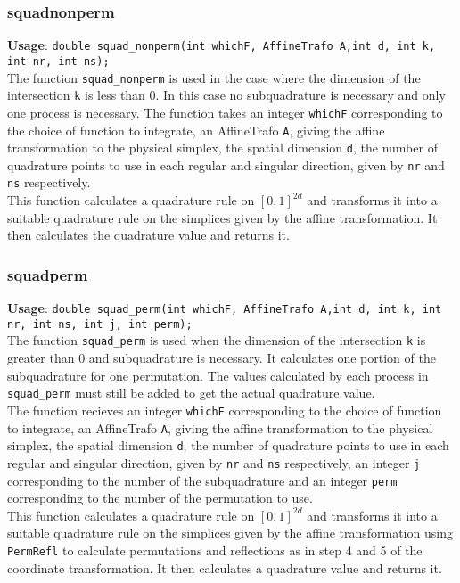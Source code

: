 \documentclass[a4paper,10pt]{article}
\begin{document}
\subsubsection{squad\textunderscore nonperm}
\textbf{Usage}: \verb=double squad_nonperm(int whichF, AffineTrafo A,int d, int k, int nr, int ns);=\\
The function \verb=squad_nonperm= is used in the case where the dimension of the intersection \verb=k= is less
than 0. In this case no subquadrature is necessary and only one process is necessary.
The function takes an integer \verb=whichF= corresponding to the choice of function to integrate, an AffineTrafo
\verb=A=, giving the affine transformation to the physical simplex, the spatial dimension \verb=d=, the number of
quadrature points to use in each regular and singular direction, given by \verb=nr= and \verb=ns= respectively.\\
This function calculates a quadrature rule on $[0,1]^{2d}$ and transforms it into a suitable quadrature rule on
the simplices given by the affine transformation. It then calculates the quadrature value and returns it.
\subsubsection{squad\textunderscore perm}
\textbf{Usage}: \verb=double squad_perm(int whichF, AffineTrafo A,int d, int k, int nr, int ns, int j, int perm);=\\
The function \verb=squad_perm= is used when the dimension of the intersection \verb=k= is greater than 0 and
subquadrature is necessary. It calculates one portion of the subquadrature for one permutation. The values 
calculated by each process in \verb=squad_perm= must still be added to get the actual quadrature value.\\
The function recieves an integer \verb=whichF= corresponding to the choice of function to integrate, an AffineTrafo
\verb=A=, giving the affine transformation to the physical simplex, the spatial dimension \verb=d=, the number of
quadrature points to use in each regular and singular direction, given by \verb=nr= and \verb=ns= respectively,
an integer \verb=j= corresponding to the number of the subquadrature and an integer \verb=perm= corresponding
to the number of the permutation to use.\\
This function calculates a quadrature rule on $[0,1]^{2d}$ and transforms it into a suitable quadrature rule on
the simplices given by the affine transformation using \verb=PermRefl= to calculate permutations and reflections
as in step 4 and 5 of the coordinate transformation. It then calculates a quadrature value and returns it.
\end{document}
